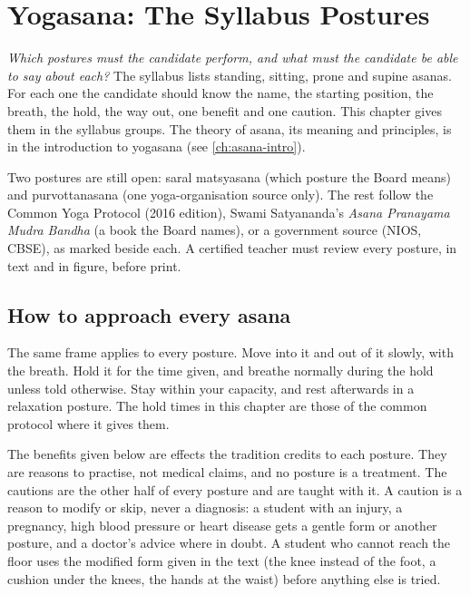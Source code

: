 \chapter{Yogasana: The Syllabus Postures}
\label{ch:asanas}

\emph{Which postures must the candidate perform, and what must the candidate be able to say about each?}
The syllabus lists standing, sitting, prone and supine asanas. For each one the candidate should know the name, the starting position, the breath, the hold, the way out, one benefit and one caution. This chapter gives them in the syllabus groups. The theory of asana, its meaning and principles, is in the introduction to yogasana (see \cref{ch:asana-intro}).

\begin{unverified}
Two postures are still open: saral matsyasana (which posture the Board means) and purvottanasana (one yoga-organisation source only). The rest follow the Common Yoga Protocol (2016 edition), Swami Satyananda's \emph{Asana Pranayama Mudra Bandha} (a book the Board names), or a government source (NIOS, CBSE), as marked beside each. A certified teacher must review every posture, in text and in figure, before print.
\end{unverified}

\section{How to approach every asana}

The same frame applies to every posture. Move into it and out of it slowly, with the breath. Hold it for the time given, and breathe normally during the hold unless told otherwise. Stay within your capacity, and rest afterwards in a relaxation posture. The hold times in this chapter are those of the common protocol where it gives them.

The benefits given below are effects the tradition credits to each posture. They are reasons to practise, not medical claims, and no posture is a treatment. The cautions are the other half of every posture and are taught with it. A caution is a reason to modify or skip, never a diagnosis: a student with an injury, a pregnancy, high blood pressure or heart disease gets a gentle form or another posture, and a doctor's advice where in doubt. A student who cannot reach the floor uses the modified form given in the text (the knee instead of the foot, a cushion under the knees, the hands at the waist) before anything else is tried.

